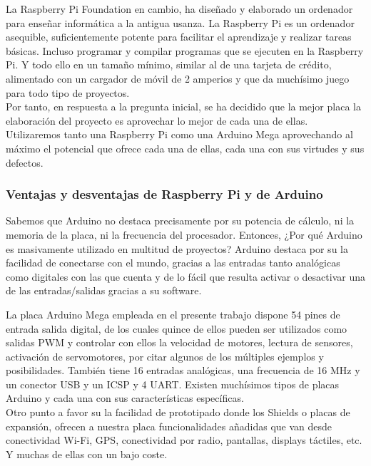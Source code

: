 La Raspberry Pi Foundation en cambio, ha diseñado y elaborado un ordenador para enseñar informática a la antigua usanza. La Raspberry Pi es un ordenador asequible, 
suficientemente potente para facilitar el aprendizaje y realizar tareas básicas. Incluso programar y compilar programas que se ejecuten en la Raspberry Pi. Y todo ello en un
tamaño mínimo, similar al de una tarjeta de crédito, alimentado con un cargador de móvil de 2 amperios y que da muchísimo juego para todo tipo de proyectos.\\

Por tanto, en respuesta a la pregunta inicial, se ha decidido que la mejor placa la elaboración del proyecto es aprovechar lo mejor de cada una de ellas. Utilizaremos tanto una Raspberry Pi
como una Arduino Mega aprovechando al máximo el potencial que ofrece cada una de ellas, cada una con sus virtudes y sus defectos.\\


\subsubsection{Ventajas y desventajas de Raspberry Pi y de Arduino}



Sabemos que Arduino no destaca precisamente por su potencia de cálculo, ni la memoria de la placa, ni la frecuencia del procesador. Entonces, ¿Por qué Arduino es masivamente utilizado
en multitud de proyectos? Arduino destaca por su la facilidad de conectarse con el mundo, gracias a las entradas tanto analógicas como digitales con las que
cuenta y de lo fácil que resulta activar o desactivar una de las entradas/salidas gracias a su software.

La placa Arduino Mega empleada en el presente trabajo dispone 54 pines de entrada salida digital, de los cuales quince de ellos pueden ser utilizados como salidas PWM y controlar 
con ellos la velocidad de motores, lectura de sensores, activación de servomotores, por citar algunos de los múltiples ejemplos y posibilidades. También tiene 16 entradas analógicas, una frecuencia de 16 MHz y un conector USB y un ICSP y 4 UART. Existen muchísimos tipos de
placas Arduino y cada una con sus características específicas.\\

Otro punto a favor su la facilidad de prototipado donde los Shields o placas de expansión, ofrecen a nuestra placa funcionalidades añadidas que van desde conectividad Wi-Fi, 
GPS, conectividad por radio, pantallas, displays táctiles, etc. Y muchas de ellas con un bajo coste.\\

